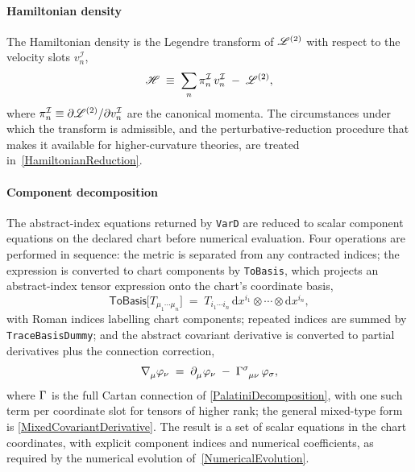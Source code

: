 \paragraph*{Hamiltonian density}
The Hamiltonian density is the Legendre transform of $\mathscr{L}^{(2)}$
with respect to the velocity slots $v^{\mathcal{I}}_n$,
\begin{equation}
  \mathscr{H}
  \;\equiv\;
  \sum_n \pi^{\mathcal{I}}_n\,v^{\mathcal{I}}_n \;-\; \mathscr{L}^{(2)},
  \label{LegendreTransform}
\end{equation}
where $\pi^{\mathcal{I}}_n \equiv \partial\mathscr{L}^{(2)}/\partial v^{\mathcal{I}}_n$
are the canonical momenta.
The circumstances under which the transform is admissible, and the
perturbative-reduction procedure that makes it available for
higher-curvature theories, are treated in~\cref{HamiltonianReduction}.

\paragraph*{Component decomposition}
The abstract-index equations returned by \texttt{VarD} are reduced to
scalar component equations on the declared chart before numerical
evaluation.
Four operations are performed in sequence: the metric is separated
from any contracted indices; the expression is converted to chart
components by \texttt{ToBasis}, which projects an abstract-index
tensor expression onto the chart's coordinate basis,
\begin{equation*}
  \textsf{ToBasis} \bigl[T_{\mu_1\cdots\mu_n}\bigr]
  \;=\; T_{i_1\cdots i_n}\,
        \mathrm{d}x^{i_1} \otimes \cdots \otimes \mathrm{d}x^{i_n},
\end{equation*}
with Roman indices labelling chart components; repeated indices are
summed by \texttt{TraceBasisDummy}; and the abstract covariant
derivative is converted to partial derivatives plus the connection
correction,
\begin{equation*}
  \rcD{_\mu}\varphi_{\nu}
  \;=\;
  \PD{_\mu}\varphi_{\nu} \;-\; \MAGA{^\sigma_\mu_\nu}\,\varphi_{\sigma},
\end{equation*}
where $\MAGA{}$ is the full Cartan connection of
\cref{PalatiniDecomposition}, with one such term per coordinate slot
for tensors of higher rank; the general mixed-type form is
\cref{MixedCovariantDerivative}.
The result is a set of scalar equations in the chart coordinates, with
explicit component indices and numerical coefficients, as required by the
numerical evolution of~\cref{NumericalEvolution}.

